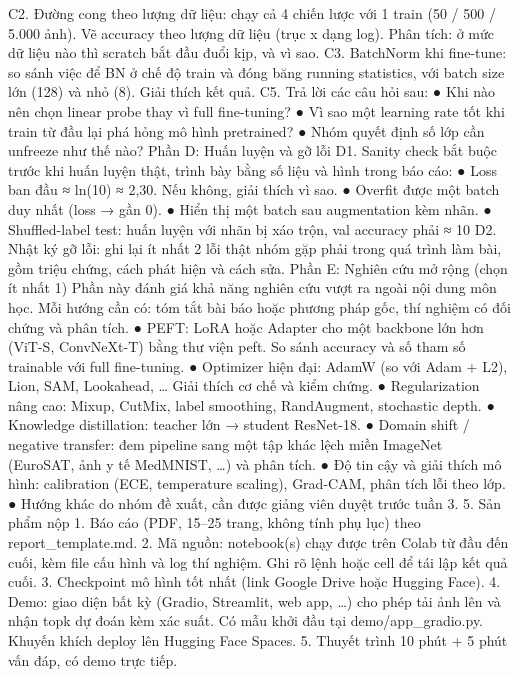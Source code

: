 C2. Đường cong theo lượng dữ liệu: chạy cả 4 chiến lược với 1%
train (50 / 500 / 5.000 ảnh). Vẽ accuracy theo lượng dữ liệu (trục x dạng log). Phân tích: ở
mức dữ liệu nào thì scratch bắt đầu đuổi kịp, và vì sao.
C3. BatchNorm khi fine-tune: so sánh việc để BN ở chế độ train và đóng băng running
statistics, với batch size lớn (128) và nhỏ (8). Giải thích kết quả.
C5. Trả lời các câu hỏi sau:
● Khi nào nên chọn linear probe thay vì full fine-tuning?
● Vì sao một learning rate tốt khi train từ đầu lại phá hỏng mô hình pretrained?
● Nhóm quyết định số lớp cần unfreeze như thế nào?
Phần D: Huấn luyện và gỡ lỗi
D1. Sanity check bắt buộc trước khi huấn luyện thật, trình bày bằng số liệu và hình trong
báo cáo:
● Loss ban đầu ≈ ln(10) ≈ 2,30. Nếu không, giải thích vì sao.
● Overfit được một batch duy nhất (loss → gần 0).
● Hiển thị một batch sau augmentation kèm nhãn.
● Shuffled-label test: huấn luyện với nhãn bị xáo trộn, val accuracy phải ≈ 10%
D2. Nhật ký gỡ lỗi: ghi lại ít nhất 2 lỗi thật nhóm gặp phải trong quá trình làm bài, gồm triệu
chứng, cách phát hiện và cách sửa.
Phần E: Nghiên cứu mở rộng (chọn ít nhất 1)
Phần này đánh giá khả năng nghiên cứu vượt ra ngoài nội dung môn học. Mỗi hướng cần có:
tóm tắt bài báo hoặc phương pháp gốc, thí nghiệm có đối chứng và phân tích.
● PEFT: LoRA hoặc Adapter cho một backbone lớn hơn (ViT-S, ConvNeXt-T) bằng thư
viện peft. So sánh accuracy và số tham số trainable với full fine-tuning.
● Optimizer hiện đại: AdamW (so với Adam + L2), Lion, SAM, Lookahead, … Giải thích
cơ chế và kiểm chứng.
● Regularization nâng cao: Mixup, CutMix, label smoothing, RandAugment, stochastic
depth.
● Knowledge distillation: teacher lớn → student ResNet-18.
● Domain shift / negative transfer: đem pipeline sang một tập khác lệch miền ImageNet
(EuroSAT, ảnh y tế MedMNIST, …) và phân tích.
● Độ tin cậy và giải thích mô hình: calibration (ECE, temperature scaling), Grad-CAM,
phân tích lỗi theo lớp.
● Hướng khác do nhóm đề xuất, cần được giảng viên duyệt trước tuần 3.
5. Sản phẩm nộp
1. Báo cáo (PDF, 15–25 trang, không tính phụ lục) theo report_template.md.
2. Mã nguồn: notebook(s) chạy được trên Colab từ đầu đến cuối, kèm file cấu hình và log thí
nghiệm. Ghi rõ lệnh hoặc cell để tái lập kết quả cuối.
3. Checkpoint mô hình tốt nhất (link Google Drive hoặc Hugging Face).
4. Demo: giao diện bất kỳ (Gradio, Streamlit, web app, …) cho phép tải ảnh lên và nhận topk dự đoán kèm xác suất. Có mẫu khởi đầu tại demo/app_gradio.py. Khuyến khích
deploy lên Hugging Face Spaces.
5. Thuyết trình 10 phút + 5 phút vấn đáp, có demo trực tiếp.